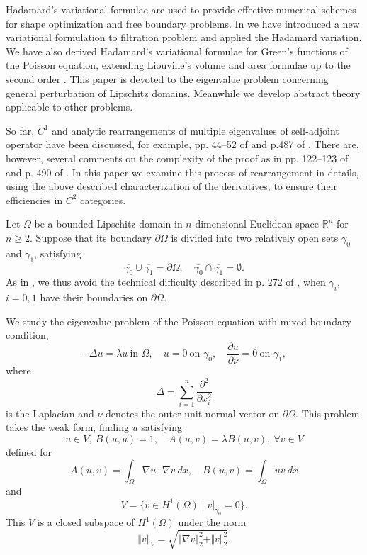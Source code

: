 \documentclass[final,a4paper]{jmsj}
\newcommand{\R}{\mathbb R}
\theoremstyle{thmstyleone}%
\theoremstyle{thmstyletwo}%
\theoremstyle{thmstylethree}%
\begin{document}
Hadamard's variational formulae are used to provide effective numerical schemes for shape optimization and free boundary problems. In \cite{st05, st11} we have introduced a new variational formulation to filtration problem and applied the Hadamard variation. We have also derived Hadamard's variational formulae for Green's functions of the Poisson equation, extending Liouville's volume and area formulae up to the second order \cite{SuzTsu16, st22}.  This paper is devoted to the eigenvalue problem concerning general perturbation of Lipschitz domains. Meanwhile we develop abstract theory applicable to other problems. 

So far, $C^1$ and analytic rearrangements of multiple eigenvalues of self-adjoint operator have been discussed, for example, pp. 44--52 of \cite{rellich53} and p.487 of \cite{ch82}. There are, however, several comments on the complexity of the proof as in pp. 122--123 of \cite{kato76} and p. 490 of \cite{ch82}.  In this paper we  examine  this process of rearrangement in details, using the above described characterization of the derivatives, to ensure their efficiencies in $C^2$ categories. 

Let $\Omega$ be a bounded Lipschitz domain in $n$-dimensional Euclidean space $\R^n$ for $n \ge 2$. Suppose that its boundary $\partial\Omega$ is divided into two relatively open  
sets $\gamma_0$ and $\gamma_1$, satisfying 
\begin{equation}
   \overline{\gamma_0} \cup \overline{\gamma_1}= \partial\Omega,
    \quad
   \overline{\gamma_0} \cap \overline{\gamma_1} = \emptyset.
  \label{assum-gamma}
\end{equation}
As in \cite{st22}, we thus avoid the technical difficulty described in p. 272 of \cite{fss01}, when $\gamma_i$, $i=0,1$ have their boundaries on $\partial\Omega$.  

We study the eigenvalue problem of the Poisson equation with mixed boundary condition, 
\begin{equation}
  - \Delta u = \lambda u \ \mbox{in $\Omega$}, \quad
      u = 0 \ \mbox{on $\gamma_0$}, \quad
      \frac{\partial u}{\partial \nu} = 0 \ \mbox{on $\gamma_1$},
   \label{2}
\end{equation}
where
\[ \Delta=\sum_{i=1}^n \frac{\partial^2}{\partial x_i^2} \] 
is the Laplacian and $\nu$ denotes the outer unit normal vector on $\partial\Omega$. This problem takes the weak form, finding $u$ satisfying  
\begin{equation} 
u\in V, \ B(u,u)=1, \quad A(u,v)=\lambda B(u,v), \ \forall v\in V 
 \label{3}
\end{equation} 
defined for  
\[ A(u,v)=\int_\Omega \nabla u\cdot \nabla v \ dx, \quad B(u,v)=\int_\Omega uv \ dx \] 
and 
\begin{equation} 
V=\{ v\in H^1(\Omega) \mid \left. v\right\vert_{\gamma_0}=0\}.   
 \label{v}
\end{equation} 
This $V$ is a closed subspace of $H^1(\Omega)$ under the norm 
\[ \Vert v\Vert_V=\sqrt{\Vert \nabla v\Vert_2^2+\Vert v\Vert_2^2}. \]  
\end{document}

